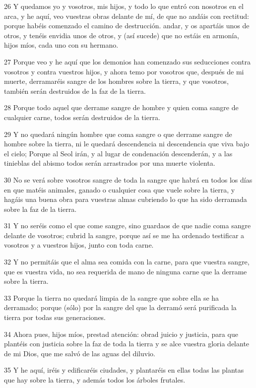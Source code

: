 \par 26 Y quedamos yo y vosotros, mis hijos, y todo lo que entró con nosotros en el arca, y he aquí, veo vuestras obras delante de mí, de que no andáis con rectitud: porque habéis comenzado el camino de destrucción. andar, y os apartáis unos de otros, y tenéis envidia unos de otros, y (así sucede) que no estáis en armonía, hijos míos, cada uno con su hermano.
\par 27 Porque veo y he aquí que los demonios han comenzado sus seducciones contra vosotros y contra vuestros hijos, y ahora temo por vosotros que, después de mi muerte, derramaréis sangre de los hombres sobre la tierra, y que vosotros, también serán destruidos de la faz de la tierra.
\par 28 Porque todo aquel que derrame sangre de hombre y quien coma sangre de cualquier carne, todos serán destruidos de la tierra.
\par 29 Y no quedará ningún hombre que coma sangre o que derrame sangre de hombre sobre la tierra, ni le quedará descendencia ni descendencia que viva bajo el cielo; Porque al Seol irán, y al lugar de condenación descenderán, y a las tinieblas del abismo todos serán arrastrados por una muerte violenta.
\par 30 No se verá sobre vosotros sangre de toda la sangre que habrá en todos los días en que matéis animales, ganado o cualquier cosa que vuele sobre la tierra, y hagáis una buena obra para vuestras almas cubriendo lo que ha sido derramada sobre la faz de la tierra.
\par 31 Y no seréis como el que come sangre, sino guardaos de que nadie coma sangre delante de vosotros; cubrid la sangre, porque así se me ha ordenado testificar a vosotros y a vuestros hijos, junto con toda carne.
\par 32 Y no permitáis que el alma sea comida con la carne, para que vuestra sangre, que es vuestra vida, no sea requerida de mano de ninguna carne que la derrame sobre la tierra.
\par 33 Porque la tierra no quedará limpia de la sangre que sobre ella se ha derramado; porque (sólo) por la sangre del que la derramó será purificada la tierra por todas sus generaciones.
\par 34 Ahora pues, hijos míos, prestad atención: obrad juicio y justicia, para que plantéis con justicia sobre la faz de toda la tierra y se alce vuestra gloria delante de mi Dios, que me salvó de las aguas del diluvio.
\par 35 Y he aquí, iréis y edificaréis ciudades, y plantaréis en ellas todas las plantas que hay sobre la tierra, y además todos los árboles frutales.
